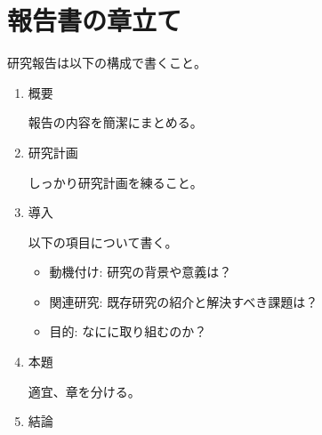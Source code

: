 \documentclass[uplatex,dvipdfmx,a4j,9pt,twocolumn,twoside]{jsarticle}
\begin{document}

\section{報告書の章立て}
研究報告は以下の構成で書くこと。
\begin{enumerate}
    \item 概要

    報告の内容を簡潔にまとめる。

    \item 研究計画
    
    しっかり研究計画を練ること。

    \item 導入

    以下の項目について書く。

    \begin{itemize}
        \item 動機付け: 研究の背景や意義は？
        \item 関連研究: 既存研究の紹介と解決すべき課題は？
        \item 目的: なにに取り組むのか？
    \end{itemize}

    \item 本題

    適宜、章を分ける。

    \item 結論
    
\end{enumerate}



\end{document}
